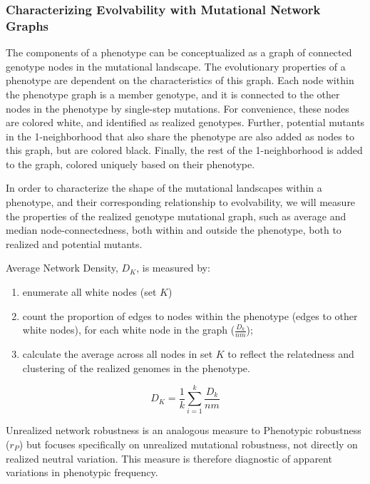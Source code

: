 \subsubsection{Characterizing Evolvability with Mutational Network Graphs}

The components of a phenotype can be conceptualized as a graph of connected genotype nodes in the mutational landscape. The evolutionary properties of a phenotype are dependent on the characteristics of this graph.  Each node within the phenotype graph is a member genotype, and it is connected to the other nodes in the phenotype by single-step mutations. For convenience, these nodes are colored white, and identified as realized genotypes. Further, potential mutants in the 1-neighborhood that also share the phenotype are also added as nodes to this graph, but are colored black. Finally, the rest of the 1-neighborhood is added to the graph, colored uniquely based on their phenotype. 

In order to characterize the shape of the mutational landscapes within a phenotype, and their corresponding relationship to evolvability, we will measure the properties of the realized genotype mutational graph, such as average and median node-connectedness, both within and outside the phenotype, both to realized and potential mutants. 



\begin{minipage}{\textwidth}

Average Network Density, $D_K$, is measured by:

\begin{enumerate}
\item enumerate all white nodes (set $K$)
\item count the proportion of edges to nodes within the phenotype (edges to other white nodes), for each white node in the graph ($\frac{D_k}{nm}$);
\item calculate the average across all nodes in set $K$ to reflect the relatedness and clustering of the realized genomes in the phenotype.
\end{enumerate}

\begin{equation}
D_{K} =  {\frac{1}{k} \sum_{i=1}^{k}}\frac{D_k}{nm} 
\end{equation}

\end{minipage}

Unrealized network robustness is an analogous measure to Phenotypic robustness ($r_P$) but focuses specifically on unrealized mutational robustness, not directly on realized neutral variation. This measure is therefore diagnostic of apparent variations in phenotypic frequency. 

